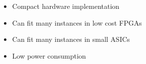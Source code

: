 \begin{itemize}
\item Compact hardware implementation
\item Can fit many instances in low cost FPGAs
\item Can fit many instances in small ASICs 
\item Low power consumption
\end{itemize}
